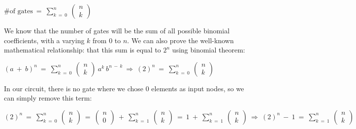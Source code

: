 \documentclass{article}
\begin{document}
\newline
\begin{center}
$\text{\#  of  gates} \ = \ \displaystyle\sum_{k \ = \ 0}^{n} \ \begin{pmatrix}n \\ k \end{pmatrix}$
\end{center}
\vspace{7}
We know that the number of gates will be the sum of all possible binomial coefficients, with a varying $k$ from $0$ to $n$. We can also prove the well-known mathematical relationship: that this sum is equal to $2^{n}$ using binomial theorem:
\newline
\begin{center}
$(a \ + \ b)^{n} \ = \ \displaystyle\sum_{k \ = \ 0}^{n} \ \begin{pmatrix}n \\ k \end{pmatrix} \ a^{k} \ b^{n \ - \ k} \ \Rightarrow \ (2)^{n} \ = \ \displaystyle\sum_{k \ = \ 0}^{n} \ \begin{pmatrix}n \\ k \end{pmatrix}$
\end{center}
\vspace{7}
In our circuit, there is no gate where we chose $0$ elements as input nodes, so we can simply remove this term:
\newline
\begin{center}
$(2)^{n} \ = \ \displaystyle\sum_{k \ = \ 0}^{n} \ \begin{pmatrix}n \\ k \end{pmatrix} \ = \ \begin{pmatrix}n \\ 0 \end{pmatrix} \ + \ \displaystyle\sum_{k \ = \ 1}^{n} \ \begin{pmatrix}n \\ k \end{pmatrix} \ = \ 1 \ + \ \displaystyle\sum_{k \ = \ 1}^{n} \ \begin{pmatrix}n \\ k \end{pmatrix} \ \Rightarrow \ (2)^{n} \ - \ 1 \ = \ \displaystyle\sum_{k \ = \ 1}^{n} \ \begin{pmatrix}n \\ k \end{pmatrix}$
\end{center}
\end{document}
